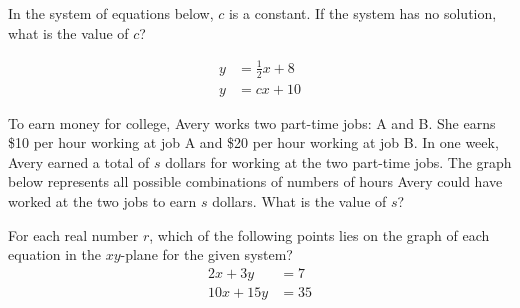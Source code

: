 \noindent\markforreview

\vspace{1em}

In the system of equations below, \( c \) is a constant. If the system has no solution, what is the value of \( c \)?

\[
\begin{aligned}
y &= \frac{1}{2}x + 8 \\
y &= cx + 10
\end{aligned}
\]

\vspace{2em}




\noindent\markforreview

\vspace{1em}

To earn money for college, Avery works two part-time jobs: A and B. She earns \$10 per hour working at job A and \$20 per hour working at job B. In one week, Avery earned a total of \( s \) dollars for working at the two part-time jobs. The graph below represents all possible combinations of numbers of hours Avery could have worked at the two jobs to earn \( s \) dollars. What is the value of \( s \)?

\begin{center}
\end{center}






\newpage
\noindent\markforreview

\vspace{1em}

For each real number \( r \), which of the following points lies on the graph of each equation in the \( xy \)-plane for the given system?
\[
\begin{aligned}
2x + 3y &= 7 \\
10x + 15y &= 35
\end{aligned}
\]


